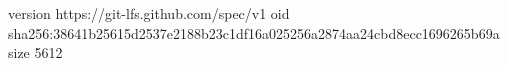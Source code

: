version https://git-lfs.github.com/spec/v1
oid sha256:38641b25615d2537e2188b23c1df16a025256a2874aa24cbd8ecc1696265b69a
size 5612
